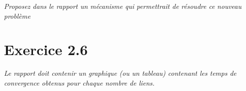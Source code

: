 \documentclass[11pt]{article}
\begin{document}
\textit{Proposez dans le rapport un mécanisme qui permettrait de résoudre ce nouveau
problème}



\section{Exercice 2.6}
\textit{Le rapport doit contenir un graphique (ou un tableau) contenant les temps de convergence obtenus
pour chaque nombre de liens.}

\vspace{10px}
\begin{center}
\end{center}

\vspace*{\fill}
\end{document}
